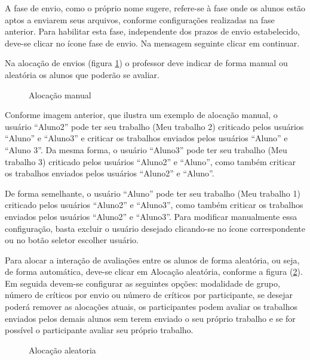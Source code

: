 A fase de envio, como o próprio nome sugere, refere-se à fase onde os alunos estão aptos a enviarem seus arquivos, conforme configurações realizadas na fase anterior. Para habilitar esta fase, independente dos prazos de envio estabelecido, deve-se clicar no ícone fase de envio. Na mensagem seguinte clicar em continuar.

Na alocação de envios (figura \ref{fig:aloc_manual}) o professor deve indicar de forma manual ou aleatória os alunos que poderão se avaliar.

\begin{figure}
 \begin{center}
  \caption{Alocação manual}
  \label{fig:aloc_manual}
 \end{center}
\end{figure}

Conforme imagem anterior, que ilustra um exemplo de alocação manual, o usuário “Aluno2” pode ter seu trabalho (Meu trabalho 2) criticado pelos usuários “Aluno” e “Aluno3” e criticar os trabalhos enviados pelos usuários “Aluno” e “Aluno 3”.  Da mesma forma, o usuário “Aluno3” pode ter seu trabalho (Meu trabalho 3) criticado pelos usuários “Aluno2” e “Aluno”, como também criticar os trabalhos enviados pelos usuários “Aluno2” e “Aluno”.

De forma semelhante, o usuário “Aluno” pode ter seu trabalho (Meu trabalho 1) criticado pelos usuários “Aluno2” e “Aluno3”, como também criticar os trabalhos enviados pelos usuários “Aluno2” e “Aluno3”. Para modificar manualmente essa configuração, basta excluir o usuário desejado clicando-se no ícone  correspondente ou no botão seletor escolher usuário.

Para alocar a interação de avaliações entre os alunos de forma aleatória, ou seja, de forma automática, deve-se clicar em
Alocação aleatória, conforme a figura (\ref{fig:aloc_aletoria}). Em seguida devem-se configurar as seguintes opções: modalidade de grupo, número de críticos por envio ou número de críticos por participante, se desejar poderá remover as alocações atuais, os participantes podem avaliar os trabalhos enviados pelos demais alunos sem terem enviado o seu próprio trabalho e se for possível o participante avaliar seu próprio trabalho.

\begin{figure}
 \begin{center}
  \caption{Alocação aleatoria}
  \label{fig:aloc_aletoria}
 \end{center}
\end{figure}

